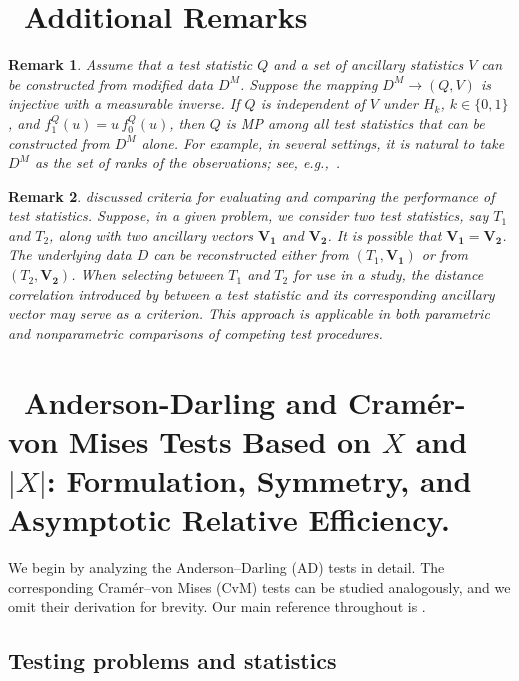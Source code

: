 \documentclass[12pt]{article}
\theoremstyle{remark}
\theoremstyle{plain}
\newtheorem{remark}{Remark}[section]
\begin{document}
	\section{\ Additional Remarks}\label{S0}
	\begin{remark}\label{Sr02}
		\emph{
			Assume that a test statistic \( Q \) and a set of ancillary statistics \( V \) can be constructed from modified data \( D^M \).  
			Suppose the mapping \( D^M \to (Q, V) \) is injective with a measurable inverse.  
			If \( Q \) is independent of \( V \) under \( H_k \), \( k \in \{0,1\} \), and \( f^{Q}_1(u) = u\, f^{Q}_0(u) \),  
			then \( Q \) is MP among all test statistics that can be constructed from \( D^M \) alone.  
			For example, in several settings, it is natural to take \( D^M \) as the set of ranks of the observations; see, e.g.,~\citet{sidak1999theory,shiraishi1986optimum}.
		}
	\end{remark}
\begin{remark}\label{2.4}
	{\em
		\citet{anderson2016note} discussed criteria for evaluating and comparing the performance of test statistics. Suppose, in a given problem, we consider two test statistics, say $T_1$ and $T_2$, along with two ancillary vectors $\mathbf{V_1}$ and $\mathbf{V_2}$. It is possible that $\mathbf{V_1} = \mathbf{V_2}$. The underlying data $D$ can be reconstructed either from $(T_1, \mathbf{V_1})$ or from $(T_2, \mathbf{V_2})$. When selecting between $T_1$ and $T_2$ for use in a study, the distance correlation introduced by \citet{szekely2007measuring} between a test statistic and its corresponding ancillary vector may serve as a criterion. This approach is applicable in both parametric and nonparametric comparisons of competing test procedures.
	}
\end{remark}


\section{\ Anderson-Darling and Cram\'{e}r-von Mises Tests Based on $X$ and  $|X|$: Formulation, Symmetry, and Asymptotic Relative Efficiency.}\label{Sn2}
We begin by analyzing the Anderson–Darling (AD) tests in detail. The corresponding Cramér–von Mises (CvM) tests can be studied analogously, and we omit their derivation for brevity. Our main reference throughout is \citet{inglot2000vanishing}.

\subsection{Testing problems and statistics}
\end{document}
